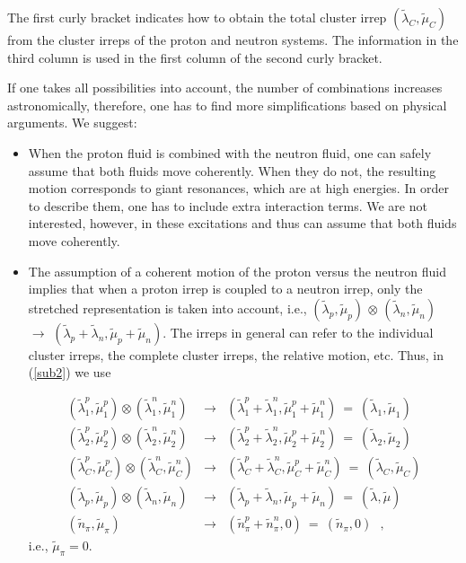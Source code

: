 \documentclass[12pt]{article}
\newcommand{\beqa}{\begin{eqnarray}}
\newcommand{\eeqa}{\end{eqnarray}}
\begin{document}
The first curly bracket indicates how to obtain the total cluster irrep 
$\left( {\tilde \lambda}_{C}, {\tilde \mu}_{C}\right)$ from the cluster irreps
of the proton and neutron systems. The information in  the third column is
used in the first column of the second curly bracket. 

If one takes all possibilities into account, the number of 
combinations increases astronomically, therefore, one has to find more
simplifications based on physical arguments. We suggest:

\begin{itemize}

\item When the proton fluid is combined with the neutron fluid, one can safely
assume that both fluids move coherently. When they do not, the resulting motion
corresponds to giant resonances, which are at high energies. In order to describe
them, one has to include extra interaction terms. We are not interested, however, in these
excitations and thus can assume that both fluids move coherently.

\item The assumption of a coherent motion of the proton versus the neutron fluid 
implies that when a proton irrep is coupled
to a neutron irrep, only the stretched representation is taken into account, i.e.,
$\left({\tilde \lambda}_p,{\tilde \mu}_p\right)$ $\otimes$ 
$\left({\tilde \lambda}_n,{\tilde \mu}_n\right)$ $\rightarrow$
$\left({\tilde \lambda}_p+{\tilde \lambda}_n,{\tilde \mu}_p+{\tilde \mu}_n\right)$. 
The irreps in general can refer to the individual cluster irreps, the complete cluster
irreps, the relative motion, etc. Thus, in  (\ref{sub2}) we use

\beqa
\left({\tilde \lambda}^p_1, {\tilde \mu}^p_1\right) \otimes 
\left({\tilde \lambda}^n_1, {\tilde \mu}^n_1\right)
& \rightarrow & \left( {\tilde \lambda}^p_1+{\tilde \lambda}^n_1, {\tilde \mu}^p_1+{\tilde \mu}^n_1
\right)
~=~ \left(\tilde{\lambda}_1,\tilde{\mu}_1\right)
\nonumber \\
\left({\tilde \lambda}^p_2, {\tilde \mu}^p_2\right) \otimes 
\left({\tilde \lambda}^n_2, {\tilde \mu}^n_2\right)
& \rightarrow & \left( {\tilde \lambda}^p_2+{\tilde \lambda}^n_2, {\tilde \mu}^p_2+{\tilde \mu}^n_2
\right)
~=~ \left(\tilde{\lambda}_2,\tilde{\mu}_2\right)
\nonumber \\
\left({\tilde \lambda}^p_C, {\tilde \mu}^p_C\right) \otimes 
\left({\tilde \lambda}^n_C, {\tilde \mu}^n_C\right)
& \rightarrow & \left( {\tilde \lambda}^p_C+{\tilde \lambda}^n_C, {\tilde \mu}^p_C+{\tilde \mu}^n_C
\right)
~=~ \left(\tilde{\lambda}_C,\tilde{\mu}_C\right)
\nonumber \\
\left({\tilde \lambda}_p, {\tilde \mu}_p\right) \otimes 
\left({\tilde \lambda}_n, {\tilde \mu}_n\right)
& \rightarrow & \left( {\tilde \lambda}_p+{\tilde \lambda}_n, {\tilde \mu}_p+{\tilde \mu}_n
\right)
~=~ \left(\tilde{\lambda},\tilde{\mu}\right)
\nonumber \\
\left( {\tilde n}_\pi, {\tilde \mu}_\pi\right) & \rightarrow &
\left( {\tilde n}^p_\pi + {\tilde n}^n_\pi, 0\right)
~=~ \left(\tilde{n}_\pi,0\right)
~~~,
\label{sub3-1}
\eeqa
i.e., ${\tilde \mu}_\pi = 0$.


\end{itemize}
\end{document}
